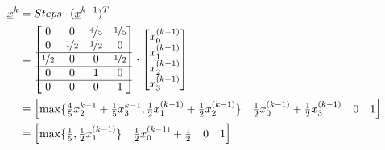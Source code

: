 \begin{align*}
	\underline{x}^k & = Steps \cdot (\underline{x}^{k-1})^T                                   \\
	                & = \begin{bmatrix}
		                    0               & 0               & \nicefrac{4}{5} & \nicefrac{1}{5} \\
		                    0               & \nicefrac{1}{2} & \nicefrac{1}{2} & 0               \\
		                    \hline
		                    \nicefrac{1}{2} & 0               & 0               & \nicefrac{1}{2} \\
		                    \hline
		                    0               & 0               & 1               & 0               \\
		                    \hline
		                    0               & 0               & 0               & 1
	                    \end{bmatrix} \cdot
	\begin{bmatrix}
		x_0^{(k-1)} \\
		x_1^{(k-1)} \\
		x_2^{(k-1)} \\
		x_3^{(k-1)}
	\end{bmatrix}                                                                            \\
	                & = \begin{bmatrix}
		                    \max \{ \frac{4}{5}x_2^{k-1}+\frac{1}{5}x_3^{k-1},
		                    \frac{1}{2} x_1^{(k-1)} + \frac{1}{2} x_2^{(k-1)} \} &
		                    \frac{1}{2} x_0^{(k-1)} + \frac{1}{2} x_3^{(k-1)}    &
		                    0                                                    &
		                    1
	                    \end{bmatrix}                \\
	                & = \begin{bmatrix}
		                    \max \{ \frac{1}{5}, \frac{1}{2} x_1^{(k-1)} \} &
		                    \frac{1}{2} x_0^{(k-1)} + \frac{1}{2}           &
		                    0                                               &
		                    1
	                    \end{bmatrix}                     \\
\end{align*}

